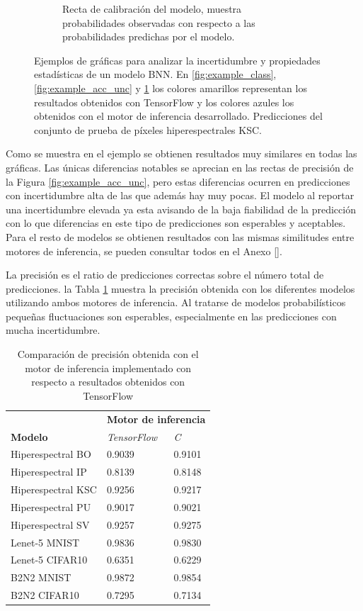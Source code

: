 \begin{figure}[H]
\begin{subfigure}[b]{0.48\textwidth}
         \caption{Recta de calibración del modelo, muestra probabilidades observadas con respecto a las probabilidades predichas por el modelo.}
         \label{fig:example_calibration}
     \end{subfigure}
        \caption{Ejemplos de gráficas para analizar la incertidumbre y propiedades estadísticas de un modelo BNN. En \ref{fig:example_class}, \ref{fig:example_acc_unc} y \ref{fig:example_calibration} los colores amarillos representan los resultados obtenidos con TensorFlow y los colores azules los obtenidos con el motor de inferencia desarrollado. Predicciones del conjunto de prueba de píxeles hiperespectrales KSC.}
        \label{fig:figure_example}
\end{figure}

Como se muestra en el ejemplo se obtienen resultados muy similares en todas las gráficas. Las únicas diferencias notables se aprecian en las rectas de precisión de la Figura \ref{fig:example_acc_unc}, pero estas diferencias ocurren en predicciones con incertidumbre alta de las que además hay muy pocas. El modelo al reportar una incertidumbre elevada ya esta avisando de la baja fiabilidad de la predicción con lo que diferencias en este tipo de predicciones son esperables y aceptables. Para el resto de modelos se obtienen resultados con las mismas similitudes entre motores de inferencia, se pueden consultar todos en el Anexo \ref{}. \todo

La precisión es el ratio de predicciones correctas sobre el número total de predicciones. la Tabla \ref{tab:engine_acc} muestra la precisión obtenida con los diferentes modelos utilizando ambos motores de inferencia. Al tratarse de modelos probabilísticos pequeñas fluctuaciones son esperables, especialmente en las predicciones con mucha incertidumbre.

\begin{table}[ht]
\centering
\caption{Comparación de precisión obtenida con el motor de inferencia implementado con respecto a resultados obtenidos con TensorFlow}
\label{tab:engine_acc}
\begin{tabular}{lll}
\hline
 &  \multicolumn{2}{c}{\textbf{Motor de inferencia}}\\
 \textbf{Modelo} & \textit{TensorFlow} & \textit{C} \\ \hline
 Hiperespectral BO   & 0.9039 & 0.9101 \\
 Hiperespectral IP   & 0.8139 & 0.8148 \\
 Hiperespectral KSC  & 0.9256 & 0.9217 \\
 Hiperespectral PU   & 0.9017 & 0.9021 \\
 Hiperespectral SV   & 0.9257 & 0.9275 \\
 Lenet-5 MNIST      & 0.9836 & 0.9830 \\
 Lenet-5 CIFAR10    & 0.6351 & 0.6229 \\
 B2N2 MNIST         & 0.9872 & 0.9854 \\
 B2N2 CIFAR10       & 0.7295 & 0.7134 \\\hline
\end{tabular}
\end{table}

